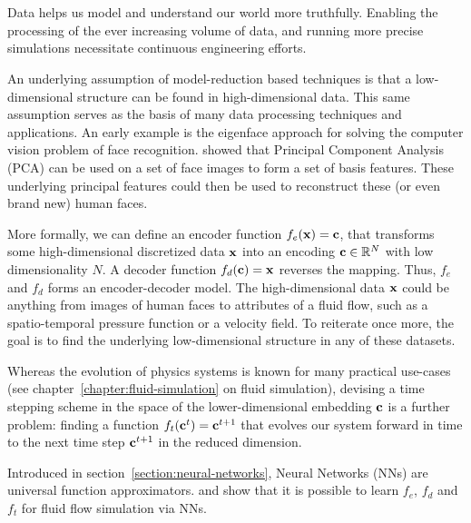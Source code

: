\chapter{\bevezetes}

Data helps us model and understand our world more truthfully. Enabling the
processing of the ever increasing volume of data, and running more precise
simulations necessitate continuous engineering efforts.

An underlying assumption of model-reduction based techniques is that
a low-dimensional structure can be found in high-dimensional data. This same
assumption serves as the basis of many data processing techniques and
applications. An early example is the eigenface approach for solving the
computer vision problem of face recognition. \citet{eigenface1987} showed that
Principal Component Analysis (PCA) can be used on a set of face images to form
a set of basis features. These underlying principal features could then be used
to reconstruct these (or even brand new) human faces.

More formally, we can define an encoder function $f_e(\vb{x}) = \vb{c}$, that
transforms some high-dimensional discretized data $\vb{x}$ into an encoding
$\vb{c} \in \mathbb{R}^{N}$ with low dimensionality $N$. A decoder function
$f_d(\vb{c}) = \vb{x}$ reverses the mapping. Thus, $f_e$ and $f_d$ forms an
encoder-decoder model. The high-dimensional data $\vb{x}$ could be anything from
images of human faces to attributes of a fluid flow, such as a spatio-temporal
pressure function or a velocity field. To reiterate once more, the goal is to
find the underlying low-dimensional structure in any of these datasets.

Whereas the evolution of physics systems is known for many practical
use-cases (see
chapter~\ref{chapter:fluid-simulation} on fluid simulation), devising a time
stepping scheme in the space of the lower-dimensional embedding $\vb{c}$ is
a further problem: finding a function $f_t(\vb{c}^t) = \vb{c}^{t+1}$ that
evolves our system forward in time to the next time step $\vb{c}^{t+1}$ in the
reduced dimension.

Introduced in section~\ref{section:neural-networks}, Neural Networks (NNs) are
universal function approximators.  \citet{LatentSpaceSubdivision} and
\citet{Wiewel2019LatentSP} show that it is possible to learn $f_e$, $f_d$ and
$f_t$ for fluid flow simulation via NNs.

